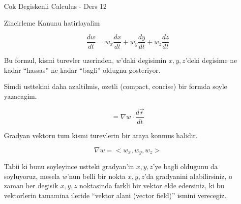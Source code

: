 \documentclass[12pt,fleqn]{article}
\begin{document}
Cok Degiskenli Calculus - Ders 12

Zincirleme Kanunu hatirlayalim

\[ \frac{dw}{dt}  = w_x \frac{dx}{dt} + 
w_y \frac{dy}{dt} + 
w_z \frac{dz}{dt}  \]

Bu formul, kismi turevler uzerinden, $w$'daki degisimin $x,y,z$'deki
degisime ne kadar ``hassas'' ne kadar ``bagli'' oldugnu gosteriyor.

Simdi usttekini daha azaltilmis, ozetli (compact, concise) bir formda soyle
yazacagim. 

\[ = \nabla w \cdot  \frac{d\vec{r}}{dt} \]

Gradyan vektoru tum kismi turevlerin bir araya konmus halidir. 

\[ \nabla w = <w_x, w_y, w_z> \]

Tabii ki bunu soyleyince ustteki gradyan'in $x,y,z$'ye bagli oldugunu da
soyluyoruz, mesela $w$'nun belli bir nokta $x,y,z$'da gradyanini
alabilirsiniz, o zaman her degisik $x,y,z$ noktasinda farkli bir vektor
elde edersiniz, ki bu vektorlerin tamamina ileride ``vektor alani (vector
field)'' ismini verecegiz.
\end{document}
